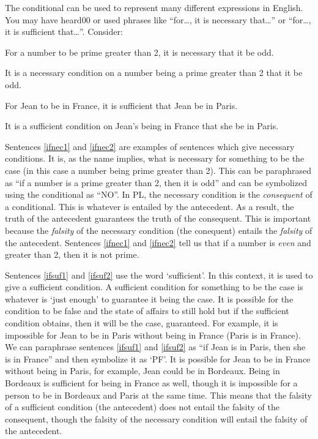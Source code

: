 The conditional can be used to represent many different expressions in English. You may have heard00 or used phrases like ``for\ldots, it is necessary that\ldots'' or ``for\ldots, it is sufficient that\ldots''. Consider:
\begin{earg}
		\item[\ex{ifnec1}] For a number to be prime greater than 2, it is necessary that it be odd.
		\item[\ex{ifnec2}] It is a necessary condition on a number being a prime greater than 2 that it be odd.
		\item[\ex{ifsuf1}] For Jean to be in France, it is sufficient that Jean be in Paris.
		\item[\ex{ifsuf2}] It is a sufficient condition on Jean's being in France that she be in Paris.
	\end{earg}
Sentences \ref{ifnec1} and \ref{ifnec2} are examples of sentences which give \glspl{necessary condition}. It is, as the name implies, what is necessary for something to be the case (in this case a number being prime greater than 2). This can be paraphrased as ``if a number is a prime greater than 2, then it is odd'' and can be symbolized using the conditional as ``N\eif O''. In PL, the necessary condition is the \emph{consequent} of a conditional. This is whatever is entailed by the antecedent. As a result, the truth of the antecedent guarantees the truth of the consequent. This is important because the \emph{falsity} of the necessary condition (the conequent) entails the \emph{falsity} of the antecedent. Sentences \ref{ifnec1} and \ref{ifnec2} tell us that if a number is \emph{even} and greater than 2, then it is not prime. 

Sentences \ref{ifsuf1} and \ref{ifsuf2} use the word `sufficient'. In this context, it is used to give a \gls{sufficient condition}. A sufficient condition for something to be the case is whatever is `just enough' to guarantee it being the case. It is possible for the condition to be false and the state of affairs to still hold but if the sufficient condition obtains, then it will be the case, guaranteed. For example, it is impossible for Jean to be in Paris without being in France (Paris is in France). We can paraphrase sentences \ref{ifsuf1} and \ref{ifsuf2} as ``if Jean is in Paris, then she is in France'' and then symbolize it as `P\eif F'. It is possible for Jean to be in France without being in Paris, for example, Jean could be in Bordeaux. Being in Bordeaux is sufficient for being in France as well, though it is impossible for a person to be in Bordeaux and Paris at the same time. This means that the falsity of a sufficient condition (the antecedent) does not entail the falsity of the consequent, though the falsity of the necessary condition will entail the falsity of the antecedent. 

